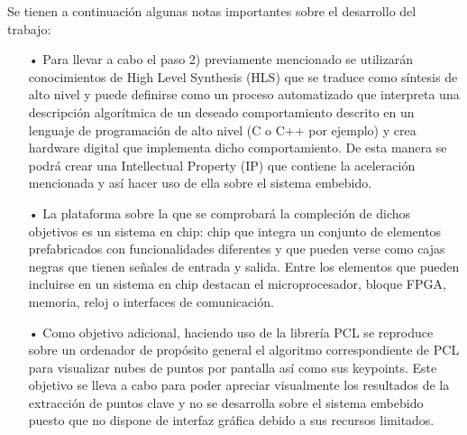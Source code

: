 Se tienen a continuación algunas notas importantes sobre el desarrollo del trabajo:
\begin{itemize}
\item[•] Para llevar a cabo el paso 2) previamente mencionado se utilizarán conocimientos de High Level Synthesis (HLS) que se traduce como síntesis de alto nivel y puede definirse como un proceso automatizado que interpreta una descripción algorítmica de un deseado comportamiento descrito en un lenguaje de programación de alto nivel (C o C++ por ejemplo) y crea hardware digital que implementa dicho comportamiento. De esta manera se podrá crear una Intellectual Property (IP) que contiene la aceleración mencionada y así hacer uso de ella sobre el sistema embebido.
\item[•] La plataforma sobre la que se comprobará la compleción de dichos objetivos es un sistema en chip: chip que integra un conjunto de elementos prefabricados con funcionalidades diferentes y que pueden verse como cajas negras que tienen señales de entrada y salida. Entre los elementos que pueden incluirse en un sistema en chip destacan el microprocesador, bloque FPGA, memoria, reloj o interfaces de comunicación.
\item[•] Como objetivo adicional, haciendo uso de la librería PCL se reproduce sobre un ordenador de propósito general el algoritmo correspondiente de PCL para visualizar nubes de puntos por pantalla así como sus keypoints. Este objetivo se lleva a cabo para poder apreciar visualmente los resultados de la extracción de puntos clave y no se desarrolla sobre el sistema embebido puesto que no dispone de interfaz gráfica debido a sus recursos limitados.
\end{itemize}

